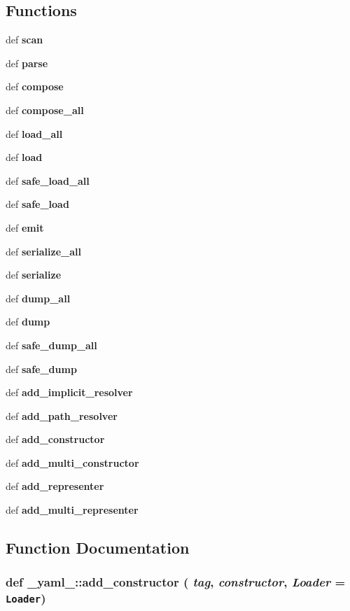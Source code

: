 \subsection*{Functions}
\begin{CompactItemize}
\item 
def {\bf scan}
\item 
def {\bf parse}
\item 
def {\bf compose}
\item 
def {\bf compose\_\-all}
\item 
def {\bf load\_\-all}
\item 
def {\bf load}
\item 
def {\bf safe\_\-load\_\-all}
\item 
def {\bf safe\_\-load}
\item 
def {\bf emit}
\item 
def {\bf serialize\_\-all}
\item 
def {\bf serialize}
\item 
def {\bf dump\_\-all}
\item 
def {\bf dump}
\item 
def {\bf safe\_\-dump\_\-all}
\item 
def {\bf safe\_\-dump}
\item 
def {\bf add\_\-implicit\_\-resolver}
\item 
def {\bf add\_\-path\_\-resolver}
\item 
def {\bf add\_\-constructor}
\item 
def {\bf add\_\-multi\_\-constructor}
\item 
def {\bf add\_\-representer}
\item 
def {\bf add\_\-multi\_\-representer}
\end{CompactItemize}


\subsection{Function Documentation}
\subsubsection{\setlength{\rightskip}{0pt plus 5cm}def \_\-yaml\_\-::add\_\-constructor ( {\em tag},  {\em constructor},  {\em Loader} = {\tt Loader})}\label{namespace__yaml___9a669f9086a360c3ce8b90cae38eb9fc}




